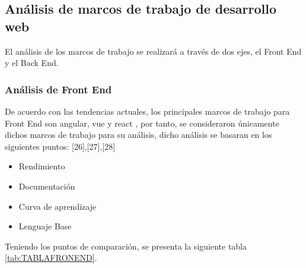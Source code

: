 \subsection{Análisis de marcos de trabajo de desarrollo web}

El análisis de los marcos de trabajo se realizará a través de dos ejes, el Front End y el Back End.
\subsubsection{Análisis de Front End}\label{cap:frontend}
De acuerdo con las tendencias actuales, los principales marcos de trabajo para Front End son  angular, vue y  react , por tanto, se consideraron únicamente dichos marcos de trabajo para su análisis, dicho análisis se basaran en los siguientes puntos: [26],[27],[28]
\begin{itemize}
	\item Rendimiento
	\item Documentación
	\item Curva de aprendizaje
	\item Lenguaje Base
\end{itemize}
Teniendo los puntos de comparación, se presenta la siguiente tabla \ref{tab:TABLAFRONEND}. 
